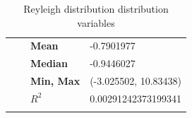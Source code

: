 \documentclass[12pt,a4paper,twoside]{article}
\begin{document}
\begin{longtable}{l|p{}|p{}|p{}}
                        &                                                               & \textbf{Mean}     & -0.7901977            \\
                        &                                                               & \textbf{Median}   & -0.9446027            \\
                        &                                                               & \textbf{Min, Max} & (-3.025502, 10.83438) \\
                        &                                                               & \textbf{$R^2$}    & 0.00291242373199341   \\
    \caption{Reyleigh distribution distribution variables}
    \label{tab:reyleighvaltab}
\end{longtable}
\end{document}
